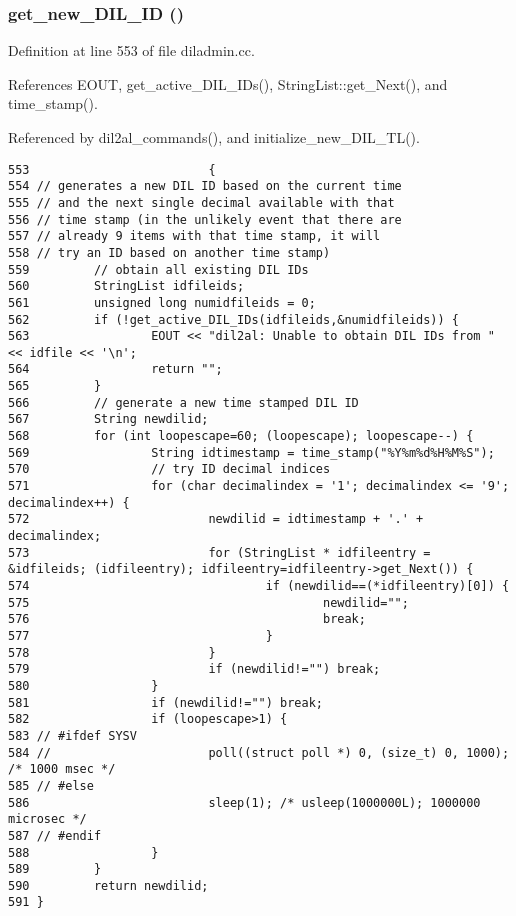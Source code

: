 \subsubsection{ get\_\-new\_\-DIL\_\-ID ()}\label{diladmin_8cc_a6}




Definition at line 553 of file diladmin.cc.

References EOUT, get\_\-active\_\-DIL\_\-IDs(), String\-List::get\_\-Next(), and time\_\-stamp().

Referenced by dil2al\_\-commands(), and initialize\_\-new\_\-DIL\_\-TL().



\footnotesize\begin{verbatim}553                         {
554 // generates a new DIL ID based on the current time
555 // and the next single decimal available with that
556 // time stamp (in the unlikely event that there are
557 // already 9 items with that time stamp, it will
558 // try an ID based on another time stamp)
559         // obtain all existing DIL IDs
560         StringList idfileids;
561         unsigned long numidfileids = 0;
562         if (!get_active_DIL_IDs(idfileids,&numidfileids)) {
563                 EOUT << "dil2al: Unable to obtain DIL IDs from " << idfile << '\n';
564                 return "";
565         }
566         // generate a new time stamped DIL ID
567         String newdilid;
568         for (int loopescape=60; (loopescape); loopescape--) { 
569                 String idtimestamp = time_stamp("%Y%m%d%H%M%S");
570                 // try ID decimal indices
571                 for (char decimalindex = '1'; decimalindex <= '9'; decimalindex++) {
572                         newdilid = idtimestamp + '.' + decimalindex;
573                         for (StringList * idfileentry = &idfileids; (idfileentry); idfileentry=idfileentry->get_Next()) {
574                                 if (newdilid==(*idfileentry)[0]) {
575                                         newdilid="";
576                                         break;
577                                 }
578                         }
579                         if (newdilid!="") break;
580                 }
581                 if (newdilid!="") break;
582                 if (loopescape>1) {
583 // #ifdef SYSV
584 //                      poll((struct poll *) 0, (size_t) 0, 1000); /* 1000 msec */
585 // #else
586                         sleep(1); /* usleep(1000000L); 1000000 microsec */
587 // #endif
588                 }
589         }
590         return newdilid;
591 }
\end{verbatim}\normalsize 
{}
